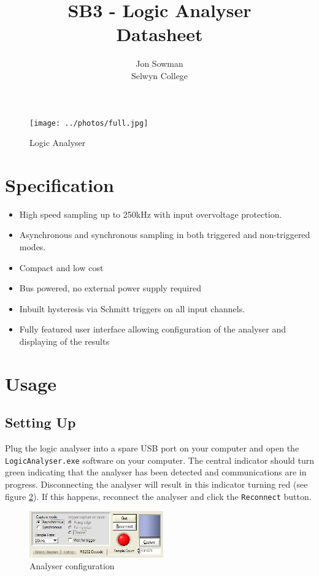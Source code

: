 \documentclass[11pt,twocolumn]{article}
\title{SB3 - Logic Analyser\\Datasheet}
\author{Jon Sowman\\Selwyn College}
\begin{document}
    \maketitle
	
    \begin{figure}
    \centering
    \texttt{[image: ../photos/full.jpg]}
    \caption{Logic Analyser}
    \label{fig:la}
    \end{figure}

\section{Specification}
    \begin{itemize}
        \item High speed sampling up to 250kHz with input overvoltage
            protection.
        \item Asynchronous and synchronous sampling in both triggered and
            non-triggered modes.
        \item Compact and low cost
        \item Bus powered, no external power supply required
        \item Inbuilt hysteresis via Schmitt triggers on all input channels.
        \item Fully featured user interface allowing configuration of the
            analyser and displaying of the results
    \end{itemize}

\section{Usage}
\subsection{Setting Up}
    Plug the logic analyser into a spare USB port on your computer and open the
    \texttt{LogicAnalyser.exe} software on your computer. The central indicator
    should turn green indicating that the analyser has been detected and
    communications are in progress. Disconnecting the analyser will result in
    this indicator turning red (see figure \ref{fig:ui-config}). 
    If this happens, reconnect the analyser and
    click the \texttt{Reconnect} button.

    \begin{figure}
    \centering
    \includegraphics[height=2cm]{ui-config}
    \caption{Analyser configuration}
    \label{fig:ui-config}
    \end{figure}
\end{document}
